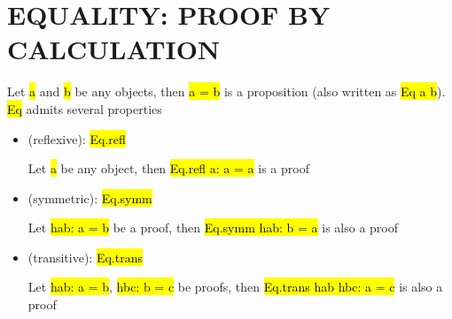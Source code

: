 \chapter{EQUALITY: PROOF BY CALCULATION}

Let \hl{a} and \hl{b} be any objects, then \hl{a = b} is a proposition (also written as \hl{Eq a b}). \hl{Eq} admits several properties

\begin{itemize}
	\item (reflexive): \hl{Eq.refl}
	
	Let \hl{a} be any object, then \hl{Eq.refl a: a = a} is a proof
	
	\item (symmetric): \hl{Eq.symm}
	
	Let \hl{hab: a = b} be a proof, then \hl{Eq.symm hab: b = a} is also a proof
	
	\item (transitive): \hl{Eq.trans}
	
	Let \hl{hab: a = b}, \hl{hbc: b = c} be proofs, then \hl{Eq.trans hab hbc: a = c} is also a proof
\end{itemize}

